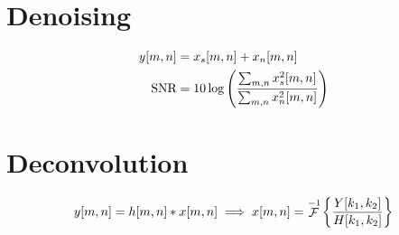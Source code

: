 \documentclass{article}
\DeclareMathOperator{\F}{\mathcal{F}}
\begin{document}
\section{Denoising}

\begin{align}
    y[m, n] &= x_s[m, n] + x_n[m, n] \\
    \text{SNR} &= 10 \log\qty(\frac{\sum_{m, n} x_s^2[m, n]}{\sum_{m, n} x_n^2[m, n]}) \\
\end{align}

\section{Deconvolution}

\begin{equation}
    y[m, n] = h[m, n] \ast x[m, n] \implies x[m, n] = \F^{-1}\qty{\frac{Y[k_1, k_2]}{H[k_1, k_2]}}
\end{equation}
\end{document}
